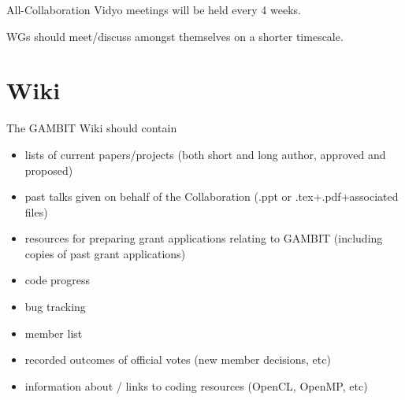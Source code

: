All-Collaboration Vidyo meetings will be held every 4 weeks.

WGs should meet/discuss amongst themselves on a shorter timescale.  


\section{Wiki}

The GAMBIT Wiki should contain 
\begin{itemize}
\item lists of current papers/projects (both short and long author, approved and proposed)
\item past talks given on behalf of the Collaboration (.ppt or .tex+.pdf+associated files)
\item resources for preparing grant applications relating to GAMBIT (including copies of past grant applications)
\item code progress
\item bug tracking
\item member list
\item recorded outcomes of official votes (new member decisions, etc)
\item information about / links to coding resources (OpenCL, OpenMP, etc)
\end{itemize}


